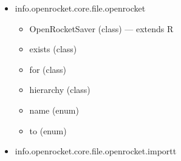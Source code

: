 \documentclass{amsdtx}
\begin{document}
\begin{itemize}
\begin{itemize}
    \begin{itemize}
    
    \item
      AbstractMotorLoader (class) --- implements M
    \item
      GeneralMotorLoader (class) --- implements M
    \item
      MotorLoader (interface) --- extends L
    \item
      RASPMotorLoader (class) --- extends A
    \item
      RSEHandler (class) --- extends A
    \item
      RSEMotorDataHandler (class) --- extends A
    \item
      RSEMotorHandler (class) --- extends A
    \item
      RockSimMotorLoader (class) --- extends A
    \item
      ZipFileMotorLoader (class) --- implements M
    \item
      that (class)
    \end{itemize}
  \item
    info.openrocket.core.file.openrocket

    \begin{itemize}
    
    \item
      OpenRocketSaver (class) --- extends R
    \item
      exists (class)
    \item
      for (class)
    \item
      hierarchy (class)
    \item
      name (enum)
    \item
      to (enum)
    \end{itemize}
  \item
    info.openrocket.core.file.openrocket.importt

    \begin{itemize}
    

\end{itemize}
\end{itemize}
\end{itemize}
\end{document}
